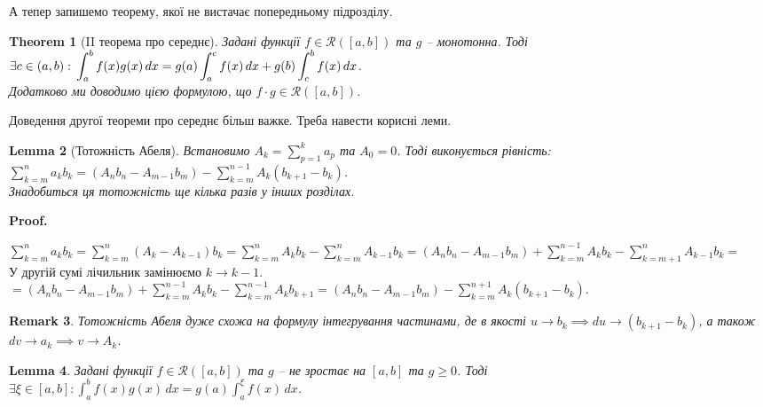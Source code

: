\documentclass[a4paper, 10pt]{article}
\makeatletter
\def\huge{\displaystyle}
\def\qed{$\blacksquare$}
\theoremstyle{theoremdd}
\newtheorem{theorem}{Theorem}[subsection]
\theoremstyle{theoremdd}
\theoremstyle{theoremdd}
\theoremstyle{theoremdd}
\theoremstyle{theoremdd}
\theoremstyle{theoremdd}
\theoremstyle{theoremdd}
\newtheorem{remark}[theorem]{Remark}
\theoremstyle{theoremdd}
\newtheorem{lemma}[theorem]{Lemma}
\theoremstyle{theoremdd}
\renewenvironment{proof}[1][Proof.\\]{\par
\pushQED{\hfill \qed}%
\normalfont \topsep6\p@\@plus6\p@\relax
\trivlist
\item\relax
{\bfseries
#1\@addpunct{.}}\hspace\labelsep\ignorespaces
}{%
\popQED\endtrivlist\@endpefalse
}
\makeatother
\begin{document}
А тепер запишемо теорему, якої не вистачає попередньому підрозділу.
\begin{theorem}[II теорема про середнє]
Задані функції $f\in \mathcal{R}([a,b])$ та $g$ -- монотонна. Тоді $\exists c \in (a,b): \\ \huge\int_a^b f(x)g(x)\,dx = g(a)\int_a^c f(x)\,dx + g(b) \int_c^b f(x)\,dx$.\\
Додатково ми доводимо цією формулою, що $f \cdot g \in \mathcal{R}([a,b])$.
\end{theorem}

Доведення другої теореми про середнє більш важке. Треба навести корисні леми.
\begin{lemma}[Тотожність Абеля]
Встановимо $A_k = \huge\sum_{p=1}^k a_p$ та $A_0 = 0$. Тоді виконується рівність:\\
$\huge\sum_{k=m}^n a_k b_k = \left(A_n b_n - A_{m-1} b_m \right) - \huge\sum_{k=m}^{n-1} A_k(b_{k+1}-b_{k})$.\\
\textit{Знадобиться ця тотожність ще кілька разів у інших розділах.}
\end{lemma}

\begin{proof}
$\huge\sum_{k=m}^n a_k b_k = \sum_{k=m}^n (A_k-A_{k-1})b_k = \sum_{k=m}^n A_k b_k - \sum_{k=m}^n A_{k-1}b_k = (A_nb_n - A_{m-1}b_m) + \sum_{k=m}^{n-1} A_k b_k - \sum_{k=m+1}^n A_{k-1}b_k \boxed{=}$\\
У другій сумі лічильник замінюємо $k \to k-1$.\\
$\boxed{=} \huge (A_nb_n - A_{m-1}b_m) + \sum_{k=m}^{n-1} A_k b_k - \sum_{k=m}^{n-1} A_{k}b_{k+1} = (A_nb_n - A_{m-1}b_m) - \sum_{k=m}^{n+1} A_k (b_{k+1}-b_k)$.
\end{proof}

\begin{remark}
Тотожність Абеля дуже схожа на формулу інтегрування частинами, де в якості $u \to b_k \implies du \to (b_{k+1}-b_k)$, а також $dv \to a_k \implies v \to A_k$.
\end{remark}

\begin{lemma}
Задані функції $f \in \mathcal{R}([a,b])$ та $g$ -- не зростає на $[a,b]$ та $g \geq 0$.  Тоді $\exists \xi \in [a,b]: \huge\int_a^b f(x)g(x)\,dx = g(a) \int_a^\xi f(x)\,dx$.
\end{lemma}
\end{document}
